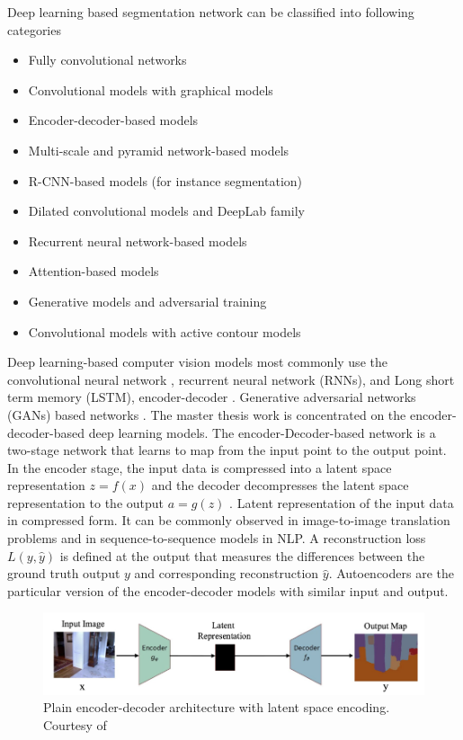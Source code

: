     Deep learning based segmentation network can be classified into following categories \cite{60_minaee2021image}
    
    \begin{itemize}
		\item Fully convolutional networks
		\item Convolutional models with graphical models
		\item Encoder-decoder-based models
		\item Multi-scale and pyramid network-based models
		\item R-CNN-based models (for instance segmentation)
		\item Dilated convolutional models and DeepLab family
		\item Recurrent neural network-based models
		\item Attention-based models
		\item Generative models and adversarial training
		\item Convolutional models with active contour models
	\end{itemize}
    
    Deep learning-based computer vision models most commonly use the convolutional neural network \cite{61_chen2017rethinking}, recurrent neural network (RNNs), and Long short term memory (LSTM), encoder-decoder \cite{62_badrinarayanan2017segnet}. Generative adversarial networks (GANs) based networks \cite{60_minaee2021image}. The master thesis work is concentrated on the encoder-decoder-based deep learning models. The encoder-Decoder-based network is a two-stage network that learns to map from the input point to the output point. In the encoder stage, the input data is compressed into a latent space representation $ z = f(x)$ and the decoder decompresses the latent space representation to the output $ a = g(z)$ \cite{63_goodfellow2014generative}. Latent representation of the input data in compressed form. It can be commonly observed in image-to-image translation problems and in sequence-to-sequence models in NLP. A reconstruction loss $ L(y, \hat{y})$ is defined at the output that measures the differences between the ground truth output $y$ and corresponding reconstruction $\hat{y}$. Autoencoders are the particular version of the encoder-decoder models with similar input and output.
    
    \begin{figure}[h]
    	\centering
    	\includegraphics[width=14cm]{images/en_de.png}
    	\caption{Plain encoder-decoder architecture with latent space encoding. Courtesy of \cite{60_minaee2021image}}
    	\label{fig:en_de}
    \end{figure} 		
    
